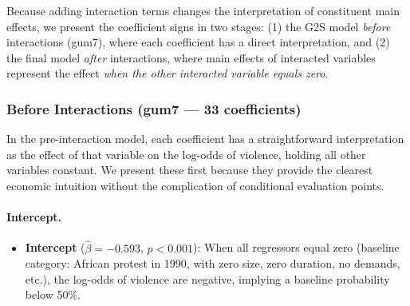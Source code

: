\documentclass[12pt,a4paper]{article}
\begin{document}
Because adding interaction terms changes the interpretation of constituent main effects, we present the coefficient signs in two stages: (1) the G2S model \emph{before} interactions (gum7), where each coefficient has a direct interpretation, and (2) the final model \emph{after} interactions, where main effects of interacted variables represent the effect \emph{when the other interacted variable equals zero}.

\subsubsection{Before Interactions (gum7 --- 33 coefficients)}

In the pre-interaction model, each coefficient has a straightforward interpretation as the effect of that variable on the log-odds of violence, holding all other variables constant. We present these first because they provide the clearest economic intuition without the complication of conditional evaluation points.

\paragraph{Intercept.}
\begin{itemize}
  \item \textbf{Intercept} ($\hat{\beta} = -0.593$, $p < 0.001$): When all regressors equal zero (baseline category: African protest in 1990, with zero size, zero duration, no demands, etc.), the log-odds of violence are negative, implying a baseline probability below 50\%.
\end{itemize}
\end{document}

